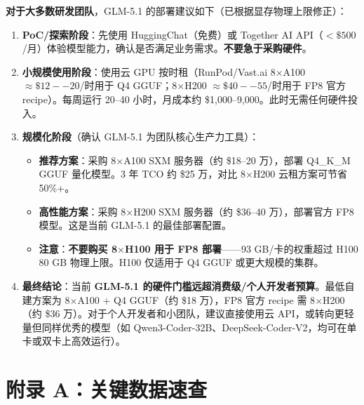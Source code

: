 \documentclass[UTF8,a4paper,10pt,oneside]{ctexart}
\begin{document}
\begin{personalnote}
\textbf{对于大多数研发团队}，GLM-5.1 的部署建议如下（已根据显存物理上限修正）：

\begin{enumerate}
    \item \textbf{PoC/探索阶段}：先使用 HuggingChat（免费）或 Together AI API（$<\$500$/月）体验模型能力，确认是否满足业务需求。\textbf{不要急于采购硬件}。

    \item \textbf{小规模使用阶段}：使用云 GPU 按时租（RunPod/Vast.ai 8$\times$A100 $\approx\$12--20$/时用于 Q4 GGUF；8$\times$H200 $\approx\$40--55$/时用于 FP8 官方 recipe）。每周运行 20--40 小时，月成本约 \$1,000--9,000。此时无需任何硬件投入。

    \item \textbf{规模化阶段}（确认 GLM-5.1 为团队核心生产力工具）：
    \begin{itemize}
        \item \textbf{推荐方案}：采购 8$\times$A100 SXM 服务器（约 \$18--20 万），部署 Q4\_K\_M GGUF 量化模型。3 年 TCO 约 \$25 万，对比 8$\times$H200 云租方案可节省 50\%+。
        \item \textbf{高性能方案}：采购 8$\times$H200 SXM 服务器（约 \$36--40 万），部署官方 FP8 模型。这是当前 GLM-5.1 的最佳部署配置。
        \item \textbf{注意}：\textbf{不要购买 8$\times$H100 用于 FP8 部署}——93 GB/卡的权重超过 H100 80 GB 物理上限。H100 仅适用于 Q4 GGUF 或更大规模的集群。
    \end{itemize}

    \item \textbf{最终结论}：当前 \textbf{GLM-5.1 的硬件门槛远超消费级/个人开发者预算}。最低自建方案为 8$\times$A100 + Q4 GGUF（约 \$18 万），FP8 官方 recipe 需 8$\times$H200（约 \$36 万）。对于个人开发者和小团队，建议直接使用云 API，或转向更轻量但同样优秀的模型（如 Qwen3-Coder-32B、DeepSeek-Coder-V2，均可在单卡或双卡上高效运行）。
\end{enumerate}
\end{personalnote}


\section*{附录 A：关键数据速查}
\end{document}
